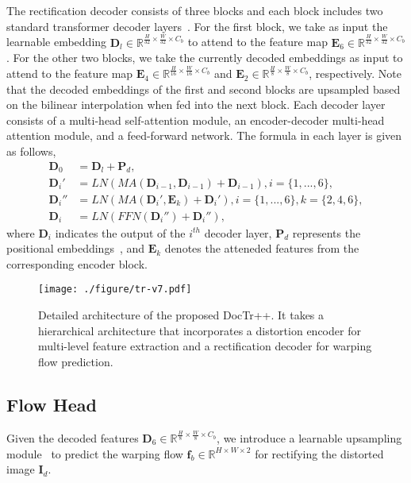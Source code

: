 \documentclass[lettersize,journal]{IEEEtran}
\begin{document}
The rectification decoder consists of three blocks and each block includes two standard transformer decoder layers~\cite{Vaswani2017AttentionIA}.
For the first block, we take as input the learnable embedding $\bm{D}_l \in \mathbb{R}^{\frac{H}{32}\times \frac{W}{32}\times C_b}$ to attend to the feature map $\bm{E}_6 \in \mathbb{R}^{\frac{H}{32}\times \frac{W}{32}\times C_b}$.
For the other two blocks, we take the currently decoded embeddings as input to attend to the feature map $\bm{E}_4 \in \mathbb{R}^{\frac{H}{16}\times \frac{W}{16}\times C_b}$ and $\bm{E}_2 \in \mathbb{R}^{\frac{H}{8}\times \frac{W}{8}\times C_b}$, respectively.
Note that the decoded embeddings of the first and second blocks are upsampled based on the bilinear interpolation when fed into the next block.
Each decoder layer consists of a multi-head self-attention module, an encoder-decoder multi-head attention module, and a feed-forward network. The formula in each layer is given as follows,
\begin{equation}
\begin{aligned}
    \bm{D}_0&=\bm{D}_{l}+\bm{P}_{d},\\
    \bm{D}_i'&=LN({MA}(\bm{D}_{i-1}, \bm{D}_{i-1})+\bm{D}_{i-1}), i=\{1,...,6\}, \\
    \bm{D}_i''&= LN({MA}(\bm{D}_i', \bm{E}_k)+\bm{D}_i'), i=\{1,...,6\}, k=\{2,4,6\},\\
    \bm{D}_i&=LN({FFN}(\bm{D}_i'')+\bm{D}_i''),
\end{aligned}
\end{equation}
where $\bm{D}_i$ indicates the output of the $i^{th}$ decoder layer, $\bm{P}_{d}$ represents the positional embeddings~\cite{bello2019attention}, and $\bm{E}_k$ denotes the atteneded features from the corresponding encoder block.


\begin{figure}[t]
  \centering
  \texttt{[image: ./figure/tr-v7.pdf]}
  \caption{Detailed architecture of the proposed DocTr++. It takes a hierarchical architecture that incorporates a distortion encoder for multi-level feature extraction and a rectification decoder for warping flow prediction. }
  \label{fig:tr}
\end{figure}


\subsection{Flow Head}
Given the decoded features $\bm{D}_6 \in \mathbb{R}^{\frac{H}{8}\times \frac{W}{8}\times C_b}$,
we introduce a learnable upsampling module~\cite{feng2021doctr} to predict the warping flow $\bm{f}_b \in \mathbb{R}^{H \times W\times 2}$ for rectifying the distorted image $\bm{I}_d$.
\end{document}
